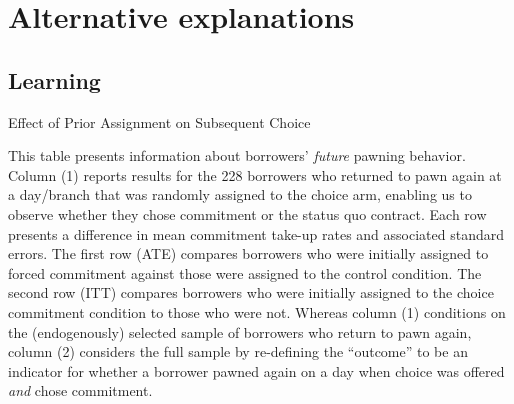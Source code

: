 \newpage
\section{Alternative explanations}

\vspace{.2in}
\subsection{Learning}

\vspace{.1in}
\begin{table}[H]
        \caption{Effect of Prior Assignment on Subsequent Choice}
    \label{learning_table}
\begin{center}
\scriptsize{}
\end{center}
 \scriptsize  

This table presents information about borrowers' \emph{future} pawning behavior.
Column (1) reports results for the 228 borrowers who returned to pawn again at a day/branch that was randomly assigned to the choice arm, enabling us to observe whether they chose commitment or the status quo contract.
Each row presents a difference in mean commitment take-up rates and associated standard errors.
The first row (ATE) compares borrowers who were initially assigned to forced commitment against those were assigned to the control condition.
The second row (ITT) compares borrowers who were initially assigned to the choice commitment condition to those who were not.
Whereas column (1) conditions on the (endogenously) selected sample of borrowers who return to pawn again, column (2) considers the full sample by re-defining the ``outcome'' to be an indicator for whether a borrower pawned again on a day when choice was offered \emph{and} chose commitment.


\end{table}




